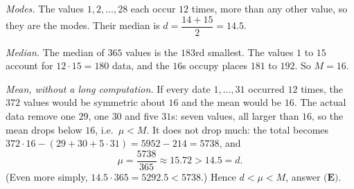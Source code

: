 \emph{Modes.} The values $1,2,\dots,28$ each occur $12$ times, more than any other value, so they are the modes. Their median is $d=\dfrac{14+15}{2}=14.5$.

\emph{Median.} The median of $365$ values is the $183$rd smallest. The values $1$ to $15$ account for $12\cdot15=180$ data, and the $16$s occupy places $181$ to $192$. So $M=16$.

\emph{Mean, without a long computation.} If every date $1,\dots,31$ occurred $12$ times, the $372$ values would be symmetric about $16$ and the mean would be $16$. The actual data remove one $29$, one $30$ and five $31$s: seven values, all larger than $16$, so the mean drops below $16$, i.e.\ $\mu<M$. It does not drop much: the total becomes $372\cdot16-(29+30+5\cdot31)=5952-214=5738$, and
\[
\mu=\dfrac{5738}{365}\approx15.72>14.5=d .
\]
(Even more simply, $14.5\cdot365=5292.5<5738$.) Hence $d<\mu<M$, answer $\boxed{\textbf{(E)}}$.
